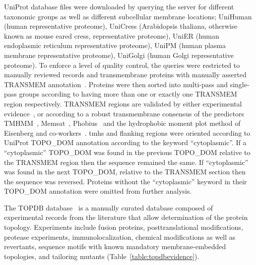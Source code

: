 UniProt database files were downloaded by querying the server for different taxonomic groups as well as different subcellular membrane locations; UniHuman (human representative proteome), UniCress (Arabidopsis thaliana, otherwise known as mouse eared cress, representative proteome), UniER (human endoplasmic reticulum representative proteome), UniPM (human plasma membrane representative proteome), UniGolgi (human Golgi representative proteome).
To enforce a level of quality control, the queries were restricted to manually reviewed records and transmembrane proteins with manually asserted TRANSMEM annotation~\cite{TheUniProtConsortium2014}.
Proteins were then sorted into multi-pass and single-pass groups according to having more than one or exactly one TRANSMEM region respectively.
TRANSMEM regions are validated by either experimental evidence~\cite{TheUniProtConsortium2014}, or according to a robust transmembrane consensus of the predictors TMHMM~\cite{Krogh2001}, Memsat~\cite{Jones2007}, Phobius~\cite{Kall2004,Kall2007} and the hydrophobic moment plot method of Eisenberg and co-workers~\cite{Eisenberg1984}.
\gls{tmh}s and flanking regions were oriented according to UniProt TOPO\_DOM annotation according to the keyword ``cytoplasmic''.
If a ``cytoplasmic'' TOPO\_DOM was found in the previous TOPO\_DOM relative to the TRANSMEM region then the sequence remained the same.
If ``cytoplasmic'' was found in the next TOPO\_DOM, relative to the TRANSMEM section then the sequence was reversed.
Proteins without the ``cytoplasmic'' keyword in their TOPO\_DOM annotation were omitted from further analysis.

The TOPDB database~\cite{Dobson2015} is a manually curated database composed of experimental records from the literature that allow determination of the protein topology.
Experiments include fusion proteins, posttranslational modifications, protease experiments, immunolocalization, chemical modifications as well as revertants, sequence motifs with known mandatory membrane-embedded topologies, and tailoring mutants (Table~\ref{table:topdbevidence}).


